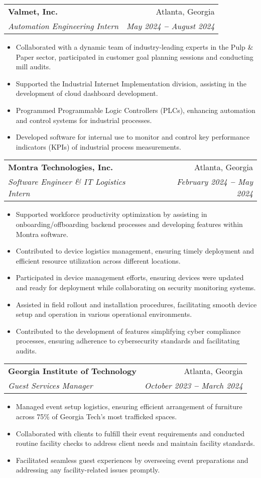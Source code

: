 \documentclass[letterpaper,11pt]{article}
\makeatletter
\newcommand{\resumeItem}[1]{
  \item\small{
    {#1 \vspace{-2pt}}
  }
}
\newcommand{\resumeSubheading}[4]{
  \vspace{-2pt}\item
    \begin{tabular*}{0.97\textwidth}[t]{l@{\extracolsep{\fill}}r}
      \textbf{#1} & #2 \\
      \textit{\small#3} & \textit{\small #4} \\
    \end{tabular*}\vspace{-7pt}
}
\newcommand{\resumeItemListStart}{\begin{itemize}}
\newcommand{\resumeItemListEnd}{\end{itemize}\vspace{-5pt}}
\makeatother
\begin{document}
  \resumeSubheading
      {Valmet, Inc.}{Atlanta, Georgia}
      {Automation Engineering Intern}{May 2024 \textbf{--} August 2024}
        \resumeItemListStart

        \resumeItem{Collaborated with a dynamic team of industry-leading experts in the Pulp \& Paper sector, participated  in customer goal planning sessions and conducting mill audits.}
        \resumeItem{Supported the Industrial Internet Implementation division, assisting in the development of cloud dashboard development.}
        \resumeItem{Programmed Programmable Logic Controllers (PLCs), enhancing automation and control systems for industrial processes.}
        \resumeItem{Developed software for internal use to monitor and control key performance indicators (KPIs) of industrial process measurements.}
        \resumeItemListEnd

    \resumeSubheading
      {Montra Technologies, Inc.}{Atlanta, Georgia}
      {Software Engineer \& IT Logistics Intern}{February 2024 \textbf{--} May 2024}
        \resumeItemListStart
        \resumeItem{Supported workforce productivity optimization by assisting in onboarding/offboarding backend processes and developing features within Montra software.}
        \resumeItem{Contributed to device logistics management, ensuring timely deployment and efficient resource utilization across different locations.}
        \resumeItem{Participated in device management efforts, ensuring devices were updated and ready for deployment while collaborating on security monitoring systems.}
        \resumeItem{Assisted in field rollout and installation procedures, facilitating smooth device setup and operation in various operational environments.}
        \resumeItem{Contributed to the development of features simplifying cyber compliance processes, ensuring adherence to cybersecurity standards and facilitating audits.}
        \resumeItemListEnd

  \resumeSubheading
      {Georgia Institute of Technology}{Atlanta, Georgia}
      {Guest Services Manager}{October 2023 \textbf{--} March 2024}
        \resumeItemListStart
            \resumeItem{Managed event setup logistics, ensuring efficient arrangement of furniture across 75\% of Georgia Tech's most trafficked spaces.}
            \resumeItem{Collaborated with clients to fulfill their event requirements and conducted routine facility checks to address client needs and maintain facility standards.}
            \resumeItem{Facilitated seamless guest experiences by overseeing event preparations and addressing any facility-related issues promptly.}
        \resumeItemListEnd
\end{document}
